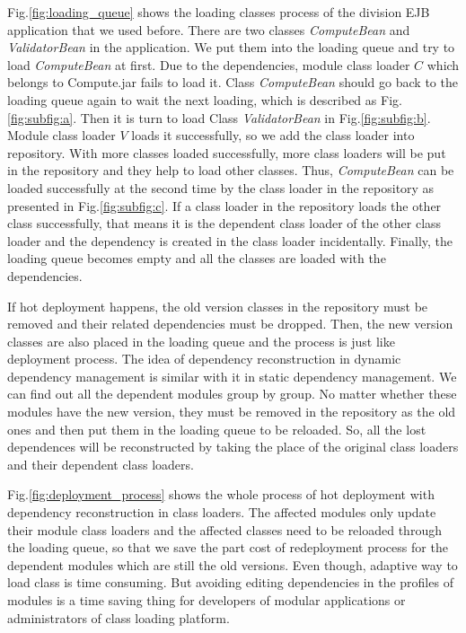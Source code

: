 \documentclass[conference]{IEEEtran}
\begin{document}
Fig.\ref{fig:loading_queue} shows the loading classes process of the division EJB application that we used before. 
There are two classes \emph{ComputeBean} and \emph{ValidatorBean} in the application. 
We put them into the loading queue and try to load \emph{ComputeBean} at first. 
Due to the dependencies, module class loader $C$ which belongs to Compute.jar fails to load it. 
Class \emph{ComputeBean} should go back to the loading queue again to wait the next loading, which is described as Fig.\ref{fig:subfig:a}. 
Then it is turn to load Class \emph{ValidatorBean} in Fig.\ref{fig:subfig:b}. 
Module class loader $V$ loads it successfully, so we add the class loader into repository. 
With more classes loaded successfully, more class loaders will be put in the repository and they help to load other classes. 
Thus, \emph{ComputeBean} can be loaded successfully at the second time by the class loader in the repository as presented in Fig.\ref{fig:subfig:c}.
If a class loader in the repository loads the other class successfully, that means it is the dependent class loader of the other class loader and the dependency is created in the class loader incidentally. 
Finally, the loading queue becomes empty and all the classes are loaded with the dependencies.

If hot deployment happens, the old version classes in the repository must be removed and their related dependencies must be dropped. 
Then, the new version classes are also placed in the loading queue and the process is just like deployment process. 
The idea of dependency reconstruction in dynamic dependency management is similar with it in static dependency management. 
We can find out all the dependent modules group by group. 
No matter whether these modules have the new version, they must be removed in the repository as the old ones and then put them in the loading queue to be reloaded. 
So, all the lost dependences will be reconstructed by taking the place of the original class loaders and their dependent class loaders. 

Fig.\ref{fig:deployment_process} shows the whole process of hot deployment with dependency reconstruction in class loaders. 
The affected modules only update their module class loaders and the affected classes need to be reloaded through the loading queue, so that we save the part cost of redeployment process for the dependent modules which are still the old versions. 
Even though, adaptive way to load class is time consuming. 
But avoiding editing dependencies in the profiles of modules is a time saving thing for developers of modular applications or administrators of class loading platform.
\end{document}
